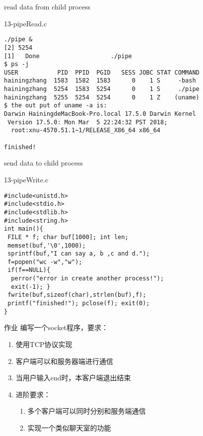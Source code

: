 \documentclass{beamer}
\begin{document}
\begin{frame}[fragile]{read data from child process}
\begin{block}{13-pipeRead.c}
\begin{verbatim}
./pipe &
[2] 5254
[1]   Done                    ./pipe
$ ps -j
USER           PID  PPID  PGID   SESS JOBC STAT COMMAND
hainingzhang  1583  1582  1583      0    1 S     -bash
hainingzhang  5254  1583  5254      0    1 S     ./pipe
hainingzhang  5255  5254  5254      0    1 Z    (uname)
$ the out put of uname -a is:
Darwin HainingdeMacBook-Pro.local 17.5.0 Darwin Kernel 
 Version 17.5.0: Mon Mar  5 22:24:32 PST 2018; 
  root:xnu-4570.51.1~1/RELEASE_X86_64 x86_64

finished!
\end{verbatim}
\end{block}
\end{frame}

\begin{frame}[fragile]{send data to child process}
\begin{block}{13-pipeWrite.c}
\begin{verbatim}
#include<unistd.h>
#include<stdio.h>
#include<stdlib.h>
#include<string.h>
int main(){
 FILE * f; char buf[1000]; int len;
 memset(buf,'\0',1000);
 sprintf(buf,"I can say a, b ,c and d.");		
 f=popen("wc -w","w");
 if(f==NULL){
  perror("error in create another process!");
  exit(-1); }
 fwrite(buf,sizeof(char),strlen(buf),f);
 printf("finished!"); pclose(f); exit(0);
}
\end{verbatim}
\end{block}
\end{frame}


\begin{frame}{作业}
编写一个socket程序，要求：
\begin{enumerate}
\item
使用TCP协议实现
\item
客户端可以和服务器端进行通信
\item
当用户输入end时，本客户端退出结束
\item
进阶要求：
\begin{enumerate}
\item
多个客户端可以同时分别和服务端通信
\item
实现一个类似聊天室的功能
\end{enumerate}

\end{enumerate}
\end{frame}
\end{document}
